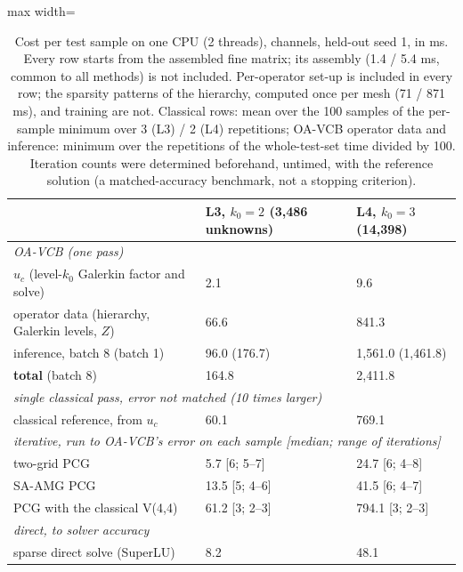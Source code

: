\begin{table}[tbp]\centering\footnotesize\setlength{\tabcolsep}{4pt}
\caption{Cost per test sample on one CPU (2 threads), channels, held-out seed 1, in ms. Every row starts from the assembled fine matrix; its assembly (1.4 / 5.4 ms, common to all methods) is not included. Per-operator set-up is included in every row; the sparsity patterns of the hierarchy, computed once per mesh (71 / 871 ms), and training are not. Classical rows: mean over the 100 samples of the per-sample minimum over 3 (L3) / 2 (L4) repetitions; OA-VCB operator data and inference: minimum over the repetitions of the whole-test-set time divided by 100. Iteration counts were determined beforehand, untimed, with the reference solution (a matched-accuracy benchmark, not a stopping criterion).}\label{tab:cost}
\begin{adjustbox}{max width=\linewidth}
\begin{tabular}{lll}\toprule
 & L3, $k_0=2$ (3{,}486 unknowns) & L4, $k_0=3$ (14{,}398) \\\midrule
\multicolumn{3}{l}{\emph{OA-VCB (one pass)}} \\
$u_c$ (level-$k_0$ Galerkin factor and solve) & 2.1 & 9.6 \\
operator data (hierarchy, Galerkin levels, $Z$) & 66.6 & 841.3 \\
inference, batch 8 (batch 1) & 96.0 (176.7) & 1{,}561.0 (1{,}461.8) \\
\textbf{total} (batch 8) & 164.8 & 2{,}411.8 \\
\midrule\multicolumn{3}{l}{\emph{single classical pass, error not matched (10 times larger)}} \\
classical reference, from $u_c$ & 60.1 & 769.1 \\
\midrule\multicolumn{3}{l}{\emph{iterative, run to OA-VCB's error on each sample [median; range of iterations]}} \\
two-grid PCG & 5.7 [6; 5--7] & 24.7 [6; 4--8] \\
SA-AMG PCG & 13.5 [5; 4--6] & 41.5 [6; 4--7] \\
PCG with the classical V(4,4) & 61.2 [3; 2--3] & 794.1 [3; 2--3] \\
\midrule\multicolumn{3}{l}{\emph{direct, to solver accuracy}} \\
sparse direct solve (SuperLU) & 8.2 & 48.1 \\
\bottomrule\end{tabular}
\end{adjustbox}
\end{table}
